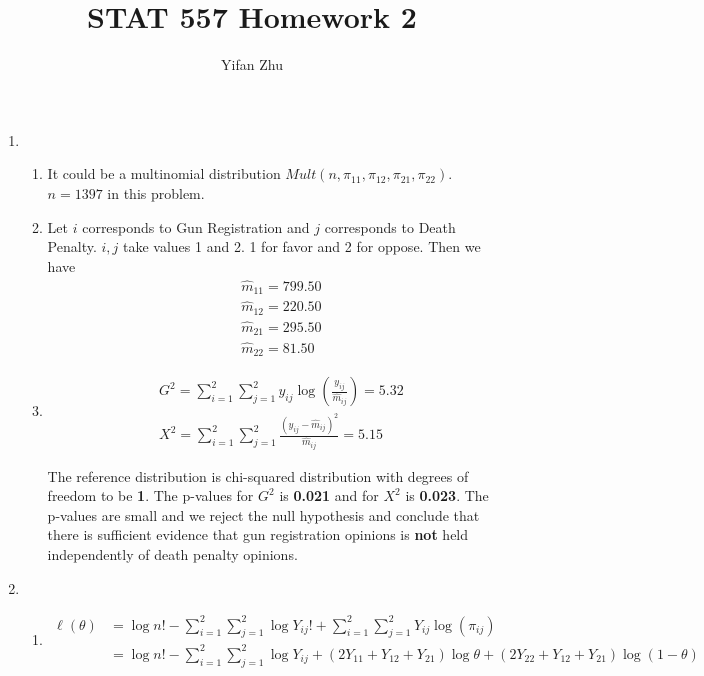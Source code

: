 \documentclass{article}
\begin{document}
	

	
	\title{STAT 557 Homework 2}
	\author{Yifan Zhu}
	\maketitle
	
	\begin{enumerate}[leftmargin = 0 em, label = \arabic*., font = \bfseries]
	\item 
	\begin{enumerate}
		\item
		It could be a multinomial distribution $Mult\left(n,\pi_{11},\pi_{12},\pi_{21},\pi_{22}\right)$. $n=1397$ in this problem.

		\item 
		Let $i$ corresponds to Gun Registration and $j$ corresponds to Death Penalty. $i,j$ take values 1 and 2. 1 for favor and 2 for oppose. Then we have
		\begin{align*}
		 &\hat{m}_{11} = 799.50\\
		 & \hat{m}_{12} = 220.50 \\
		 & \hat{m}_{21} = 295.50 \\
		 & \hat{m}_{22} = 81.50
		 \end{align*}


		 \item 
		 \begin{align*}
		 & G^2 = \sum_{i=1}^2 \sum_{j=1}^2 y_{ij} \log\left(\frac{y_{ij}}{\hat{m}_{ij}}\right) = 5.32\\
		 & X^2 = \sum_{i=1}^2 \sum_{j=1}^2 \frac{(y_{ij} - \hat{m}_{ij})^2}{\hat{m}_{ij}} = 5.15
		 \end{align*}

		 The reference distribution is chi-squared distribution with degrees of freedom to be {\bf 1}. The p-values for $G^2$ is \textbf{0.021} and for $X^2$ is\textbf{ 0.023}. The p-values are small and we reject the null hypothesis and conclude that there is sufficient evidence that gun registration opinions is \textbf{not} held independently of death penalty opinions. 
		
	\end{enumerate}


	\item 
	\begin{enumerate}
		\item
	\begin{align*}
		\ell (\theta) &= \log n! - \sum_{i=1}^2 \sum_{j=1}^2 \log Y_{ij}! + \sum_{i=1}^2 \sum_{j=1}^2 Y_{ij} \log (\pi_{ij}) \\
		&= \log n! - \sum_{i=1}^2 \sum_{j=1}^2 \log Y_{ij} +(2 Y_{11} + Y_{12} + Y_{21})\log \theta + (2 Y_{22} + Y_{12} + Y_{21}) \log (1 -\theta)
		\end{align*}


\end{enumerate}
\end{enumerate}
\end{document}
